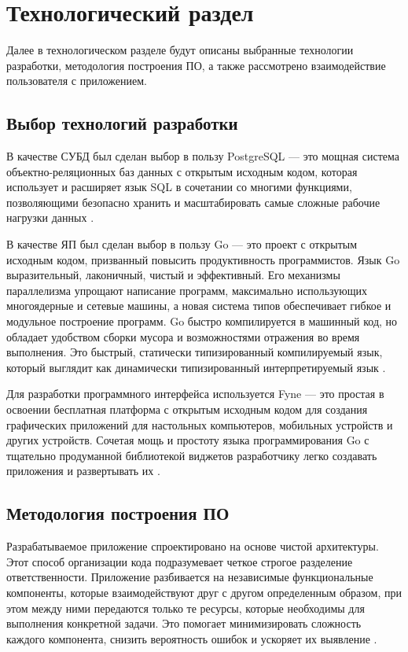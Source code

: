 \chapter{Технологический раздел}
\label{cha:impl}

Далее в технологическом разделе будут описаны выбранные технологии разработки, методология построения ПО, а также рассмотрено взаимодействие пользователя с приложением.


\section{Выбор технологий разработки}

В качестве СУБД был сделан выбор в пользу PostgreSQL --- это мощная система объектно-реляционных баз данных с открытым исходным кодом, которая использует и расширяет язык SQL в сочетании со многими функциями, позволяющими безопасно хранить и масштабировать самые сложные рабочие нагрузки данных \cite{postgre}.

В качестве ЯП был сделан выбор в пользу Go --- это проект с открытым исходным кодом, призванный повысить продуктивность программистов. Язык Go выразительный, лаконичный, чистый и эффективный. Его механизмы параллелизма упрощают написание программ, максимально использующих многоядерные и сетевые машины, а новая система типов обеспечивает гибкое и модульное построение программ. Go быстро компилируется в машинный код, но обладает удобством сборки мусора и возможностями отражения во время выполнения. Это быстрый, статически типизированный компилируемый язык, который выглядит как динамически типизированный интерпретируемый язык \cite{golang}.

Для разработки программного интерфейса используется Fyne --- это простая в освоении бесплатная платформа с открытым исходным кодом для создания графических приложений для настольных компьютеров, мобильных устройств и других устройств. Сочетая мощь и простоту языка программирования Go с тщательно продуманной библиотекой виджетов разработчику легко создавать приложения и развертывать их \cite{fyne}.

\section{Методология построения ПО}

Разрабатываемое приложение спроектировано на основе чистой архитектуры. Этот способ организации кода подразумевает четкое строгое разделение ответственности. Приложение разбивается на независимые функциональные компоненты, которые взаимодействуют друг с другом определенным образом, при этом между ними передаются только те ресурсы, которые необходимы для выполнения конкретной задачи. Это помогает минимизировать сложность каждого компонента, снизить вероятность ошибок и ускоряет их выявление \cite{cleancode}.

